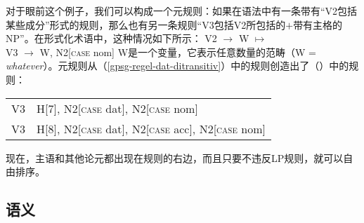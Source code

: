 对于眼前这个例子，我们可以构成一个元规则：如果在语法中有一条带有“V2包括某些成分”形式的规则，那么也有另一条规则“V3包括V2所包括的$+$带有主格的NP”。在形式化术语中，这种情况如下所示：
\ea
\label{subjekt-meta}
V2  $\to$ W $\mapsto$\\
V3  $\to$ W, N2[\textsc{case} nom]
\z
W是一个变量，它表示任意数量的范畴（W = \emph{what\-ever}）。元规则从（\ref{gpsg-regel-dat-ditransitiv}）中的规则创造出了（）中的规则：
\ea
\begin{tabular}[t]{@{}l@{~$\to$~}l@{}}
V3  & H[7], N2[\textsc{case} dat], N2[\textsc{case} nom]                \\
V3  & H[8], N2[\textsc{case} dat], N2[\textsc{case} acc], N2[\textsc{case} nom]  \\
\end{tabular}
\z

\noindent
现在，主语和其他论元都出现在规则的右边，而且只要不违反LP规则，就可以自由排序。

\subsection{语义}
\label{Sec-GPSG-Sem}

